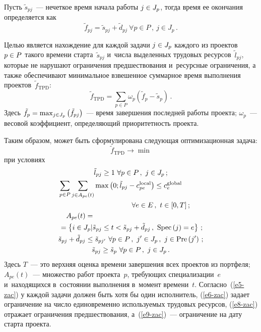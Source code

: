 \begin{multicols}{2}
  Пусть $\tilde{s}_{pj}$~--- нечеткое время начала работы $j\hm\in J_p$, тогда 
время ее окончания определяется как
  \begin{equation*}
  \tilde{f}_{pj}=\tilde{s}_{pj}+\tilde{d}_{pj}\ \forall p\in P\,,\ j\in J_p\,.
  \end{equation*}
    
  Целью является нахождение для каждой задачи $j\hm\in J_p$ каждого из 
проектов $p\hm\in P$ такого времени старта~$\tilde{s}_{pj}$ и~числа 
выделенных трудовых ресурсов~$\tilde{l}_{pj}$, которые не нарушают 
ограничения предшествования и~ресурсные ограничения, а также обеспечивают 
минимальное взвешенное суммарное время выполнения 
проектов~$\tilde{f}_{\mathrm{TPD}}$:
  \begin{equation*}
  \tilde{f}_{\mathrm{TPD}}= \sum\limits_{p\in P} \omega_p \left( \tilde{f}_p-
\tilde{s}_p\right)\,.
  \end{equation*}
  Здесь $\tilde{f}_p\hm= \max\nolimits_{j\in J_p} \left( \tilde{f}_{pj}\right)$~--- 
время завершения последней работы проекта; $\omega_p$~--- весовой 
коэффициент, определяющий приоритетность проекта.
  
  Таким образом, может быть сформулирована следующая оптимизационная 
задача:
  \begin{equation}
  \tilde{f}_{\mathrm{TPD}}\to \min
  \label{e4-zac}
  \end{equation}
при условиях
\begin{gather}
\tilde{l}_{pj}\geq 1\ \forall p\in P\,,\  j\in J_p\,;\label{e5-zac}\\
\hspace*{-10mm}\sum\limits_{p\in P} \sum\limits_{j\in A_{pe}(t)}\max\left( 0; \tilde{l}_{pj}-
c_{pe}^{\mathrm{local}} \right) \leq c_e^{\mathrm{global}}\notag\\
\hspace*{30mm} \forall e\in E\,,\ t\in [0,T]\,;\label{e6-zac}\\
A_{pe}(t)={}\hspace*{50mm}\notag\\
{}=\left\{ i\in J_p\vert \tilde{s}_{pj}\leq t< \tilde{s}_{pj} +\tilde{d}_{pj}\,, \ 
\mathrm{Spec}\,(j)=e\right\}\,;\label{e7-zac}\\
\tilde{s}_{pj}+\tilde{d}_{pj}\leq \tilde{s}_{pj^\prime}\ \forall p\in P\,,\ j^\prime \in 
J_p\,,\ j\in \mathrm{Pre}\left(j^\prime\right)\,;\label{e8-zac}\\
\tilde{s}_{pj}\geq \tilde{s}_p\ \forall p\in P\,,\ j\in J_p\,.
\label{e9-zac}
\end{gather}
  Здесь $T$~--- это верхняя оценка времени завершения всех проектов из 
портфеля; $A_{pe}(t)$~--- множество работ проекта~$p$, требующих 
специализации~$e$ и~находящихся в~состоянии выполнения в~момент 
времени~$t$. Согласно~(\ref{e5-zac}) у каждой задачи должен быть хотя бы 
один исполнитель, (\ref{e6-zac}) задает ограничение на число единовременно 
используемых трудовых ресурсов, (\ref{e8-zac}) отражает ограничения 
предшествования, а~(\ref{e9-zac})~--- ограничение на дату старта проекта.
  

\end{multicols}
